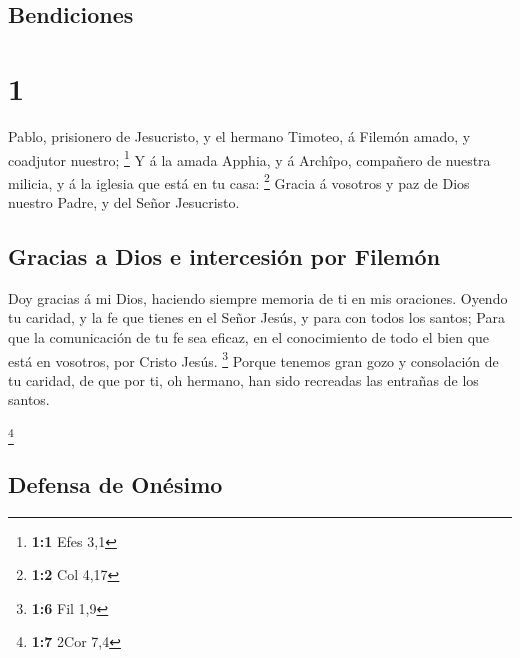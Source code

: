 \hypertarget{bendiciones}{%
\subsection{Bendiciones}\label{bendiciones}}

\hypertarget{section}{%
\section{1}\label{section}}

 Pablo, prisionero de Jesucristo, y el hermano Timoteo, á
Filemón amado, y coadjutor nuestro; \footnote{\textbf{1:1} Efes 3,1}
 Y á la amada Apphia, y á Archîpo, compañero de nuestra
milicia, y á la iglesia que está en tu casa: \footnote{\textbf{1:2} Col
  4,17}  Gracia á vosotros y paz de Dios nuestro Padre, y
del Señor Jesucristo.

\hypertarget{gracias-a-dios-e-intercesiuxf3n-por-filemuxf3n}{%
\subsection{Gracias a Dios e intercesión por
Filemón}\label{gracias-a-dios-e-intercesiuxf3n-por-filemuxf3n}}

 Doy gracias á mi Dios, haciendo siempre memoria de ti en
mis oraciones.  Oyendo tu caridad, y la fe que tienes en el
Señor Jesús, y para con todos los santos;  Para que la
comunicación de tu fe sea eficaz, en el conocimiento de todo el bien que
está en vosotros, por Cristo Jesús. \footnote{\textbf{1:6} Fil 1,9}
 Porque tenemos gran gozo y consolación de tu caridad, de
que por ti, oh hermano, han sido recreadas las entrañas de los santos.

\footnote{\textbf{1:7} 2Cor 7,4}

\hypertarget{defensa-de-onuxe9simo}{%
\subsection{Defensa de Onésimo}\label{defensa-de-onuxe9simo}}


